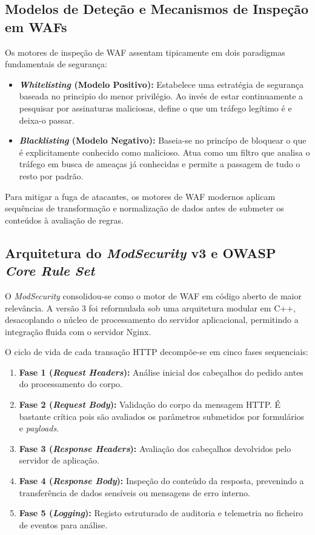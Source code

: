 \documentclass[11pt,a4paper]{article}
\begin{document}
\subsection{Modelos de Deteção e Mecanismos de Inspeção em WAFs}
Os motores de inspeção de WAF assentam tipicamente em dois paradigmas fundamentais de segurança:
\begin{itemize}
    \item \textbf{\textit{Whitelisting} (Modelo Positivo):} Estabelece uma estratégia de segurança baseada no principio do menor privilégio. Ao invés de estar continuamente a pesquisar por assinaturas maliciosas, define o que um tráfego legítimo é e deixa-o passar.
    \item \textbf{\textit{Blacklisting} (Modelo Negativo):} Baseia-se no princípo de bloquear o que é explicitamente conhecido como malicioso. Atua como um filtro que analisa o tráfego em busca de ameaças já conhecidas e permite a passagem de tudo o resto por padrão.
\end{itemize}

Para mitigar a fuga de atacantes, os motores de WAF modernos aplicam sequências de transformação e normalização de dados antes de submeter os conteúdos à avaliação de regras.

\newpage
\subsection{Arquitetura do \textit{ModSecurity} v3 e OWASP \textit{Core Rule Set}}
O \textit{ModSecurity} consolidou-se como o motor de WAF em código aberto de maior relevância. A versão 3 foi reformulada sob uma arquitetura modular em C++, desacoplando o núcleo de processamento do servidor aplicacional, permitindo a integração fluida com o servidor Nginx.

O ciclo de vida de cada transação HTTP decompõe-se em cinco fases sequenciais:
\begin{enumerate}
    \item \textbf{Fase 1 (\textit{Request Headers}):} Análise inicial dos cabeçalhos do pedido antes do processamento do corpo.
    \item \textbf{Fase 2 (\textit{Request Body}):} Validação do corpo da mensagem HTTP. É bastante crítica pois são avaliados os parâmetros submetidos por formulários e \textit{payloads}.
    \item \textbf{Fase 3 (\textit{Response Headers}):} Avaliação dos cabeçalhos devolvidos pelo servidor de aplicação.
    \item \textbf{Fase 4 (\textit{Response Body}):} Inspeção do conteúdo da resposta, prevenindo a transferência de dados sensíveis ou mensagens de erro interno.
    \item \textbf{Fase 5 (\textit{Logging}):} Registo estruturado de auditoria e telemetria no ficheiro de eventos para análise.
\end{enumerate}
\end{document}
